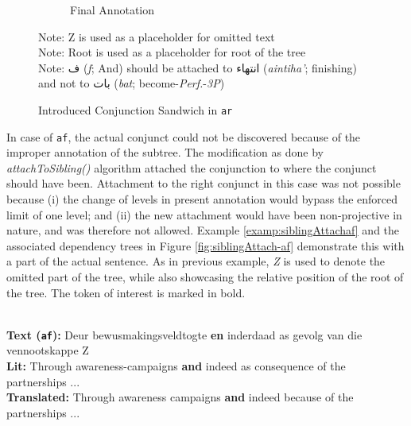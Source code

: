 \begin{figure}[H]
\begin{subfigure}{\textwidth}
    \caption{Final Annotation}
    \label{fig:siblingAttach-ar-2}
    \end{subfigure}
    \caption{Introduced Conjunction Sandwich in \texttt{ar}}
    Note: Z is used as a placeholder for omitted text\\
    Note: Root is used as a placeholder for root of the tree\\
    Note: \textarabic{ف} (\textit{f}; And) should be attached to \textarabic{انتهاء} (\textit{aintiha'}; finishing) and not to \textarabic{بات} (\textit{bat}; become-\textit{Perf.}-\textit{3P})
    \label{fig:siblingAttach-ar}
\end{figure}

 In case of \verb|af|, the actual conjunct could not be discovered because of the improper annotation of the subtree. The modification as done by \textit{attachToSibling()} algorithm attached the conjunction to where the conjunct should have been. Attachment to the right conjunct in this case was not possible because (i) the change of levels in present annotation would bypass the enforced limit of one level; and (ii) the new attachment would have been non-projective in nature, and was therefore not allowed. Example \ref{examp:siblingAttachaf} and the associated dependency trees in Figure \ref{fig:siblingAttach-af} demonstrate this with a part of the actual sentence. As in previous example, \textit{Z} is used to denote the omitted part of the tree, while also showcasing the relative position of the root of the tree. The token of interest is marked in bold.
 
\begin{example}
\label{examp:siblingAttachaf}
\textbf{ }\\
\textbf{Text (\texttt{af}):} Deur bewusmakingsveldtogte \textbf{en} inderdaad as gevolg van die vennootskappe Z\\
\textbf{Lit:} Through awareness-campaigns \textbf{and} indeed as consequence of the partnerships ...\\ 
\textbf{Translated:} Through awareness campaigns \textbf{and} indeed because of the partnerships ...
\end{example}

